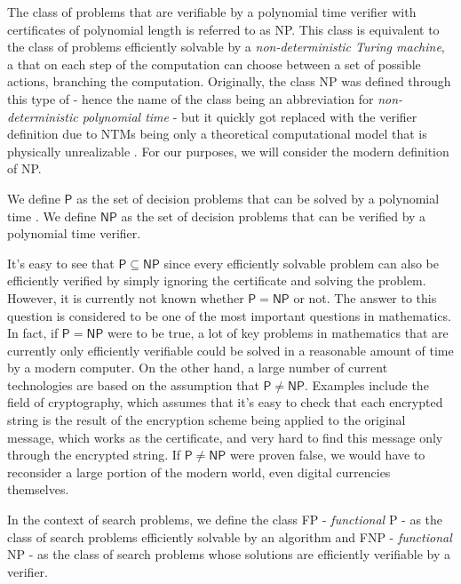 The class of problems that are verifiable by a polynomial time verifier with certificates of polynomial length is referred to as \textsf{NP}. This class is equivalent to the class of problems efficiently solvable by a \textit{non-deterministic Turing machine}, a \TM that on each step of the computation can choose between a set of possible actions, branching the computation. Originally, the class \textsf{NP} was defined through this type of \TM \@ - hence the name of the class being an abbreviation for \textit{non-deterministic polynomial time} - but it quickly got replaced with the verifier definition due to \textsf{NTM}s being only a theoretical computational model that is physically unrealizable \cite{complexity_arora_barak}. For our purposes, we will consider the modern definition of \textsf{NP}.

\begin{definition}
    We define $\mathsf{P}$ as the set of decision problems that can be solved by a polynomial time \TM. We define $\mathsf{NP}$ as the set of decision problems that can be verified by a polynomial time verifier.
\end{definition}

It's easy to see that $\mathsf{P} \subseteq \mathsf{NP}$ since every efficiently solvable problem can also be efficiently verified by simply ignoring the certificate and solving the problem. However, it is currently not known whether $\mathsf{P} = \mathsf{NP}$ or not. The answer to this question is considered to be one of the most important questions in mathematics. In fact, if $\mathsf{P} = \mathsf{NP}$ were to be true, a lot of key problems in mathematics that are currently only efficiently verifiable could be solved in a reasonable amount of time by a modern computer. On the other hand, a large number of current technologies are based on the assumption that $\mathsf{P} \neq \mathsf{NP}$. Examples include the field of cryptography, which assumes that it's easy to check that each encrypted string is the result of the encryption scheme being applied to the original message, which works as the certificate, and very hard to find this message only through the encrypted string. If $\mathsf{P} \neq \mathsf{NP}$ were proven false, we would have to reconsider a large portion of the modern world, even digital currencies themselves.

In the context of search problems, we define the class \textsf{FP} - \textit{functional} \textsf{P} - as the class of search problems efficiently solvable by an algorithm and \textsf{FNP} - \textit{functional} \textsf{NP} - as the class of search problems whose solutions are efficiently verifiable by a verifier. 

